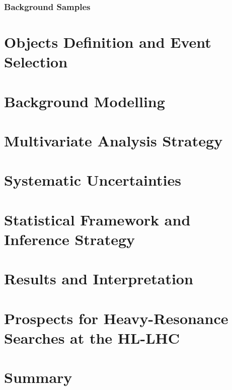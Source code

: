 \subsubsection{Background Samples}
\label{subsec:background_samples}


\section{Objects Definition and Event Selection}
\label{subsec:objects_selection}


\section{Background Modelling}
\label{subsec:background_modelling}


\section{Multivariate Analysis Strategy}
\label{subsec:multivariate_strategy}


\section{Systematic Uncertainties}
\label{subsec:systematic_uncertainties}


\section{Statistical Framework and Inference Strategy}
\label{subsec:statistical_framework}


\section{Results and Interpretation}
\label{subsec:results_interpretation}


\section{Prospects for Heavy-Resonance Searches at the HL-LHC}
\label{subsec:HL-LHC_prospects}


\section{Summary}
\label{sec:conclusion}

